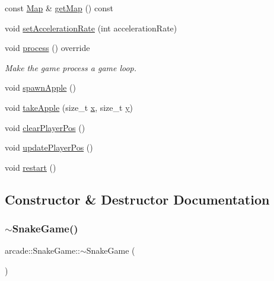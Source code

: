 \begin{DoxyCompactItemize}
const \hyperlink{classarcade_1_1_map}{Map} \& \hyperlink{classarcade_1_1_snake_game_ae11798650684c74dfe0ac61ccb4fc859}{get\+Map} () const
\item 
void \hyperlink{classarcade_1_1_snake_game_a72ed46dfc25cd85c27277705bd93166a}{set\+Acceleration\+Rate} (int acceleration\+Rate)
\item 
void \hyperlink{classarcade_1_1_snake_game_a8a04d76c02f814a01a27f394775ea2f7}{process} () override
\begin{DoxyCompactList}\small\item\em Make the game process a game loop. \end{DoxyCompactList}\item 
void \hyperlink{classarcade_1_1_snake_game_ae35a0091366ec46ab795642ea40d67b9}{spawn\+Apple} ()
\item 
void \hyperlink{classarcade_1_1_snake_game_a5b9b4898677db2d24f993bac6f25c49e}{take\+Apple} (size\+\_\+t \hyperlink{include_2_protocol_8hpp_a4dde988b1b2adba65ae3efa69f65d960}{x}, size\+\_\+t \hyperlink{include_2_protocol_8hpp_ab0580f504a7428539be299fa71565f30}{y})
\item 
void \hyperlink{classarcade_1_1_snake_game_a8d71cb1e19e5158d10e805d152b88fc6}{clear\+Player\+Pos} ()
\item 
void \hyperlink{classarcade_1_1_snake_game_a251558fddc91c0e15d10f413a2633994}{update\+Player\+Pos} ()
\item 
void \hyperlink{classarcade_1_1_snake_game_a508e4f2107e92ff4648254ff421bf1f6}{restart} ()
\end{DoxyCompactItemize}


\subsection{Constructor \& Destructor Documentation}
\mbox{\label{classarcade_1_1_snake_game_a9823e31ef82d6be7689a45933097a554}} 
\subsubsection{\texorpdfstring{$\sim$\+Snake\+Game()}{~SnakeGame()}}
{\footnotesize\ttfamily arcade\+::\+Snake\+Game\+::$\sim$\+Snake\+Game (\begin{DoxyParamCaption}{ }\end{DoxyParamCaption})\hspace{0.3cm}{\ttfamily [virtual]}}

